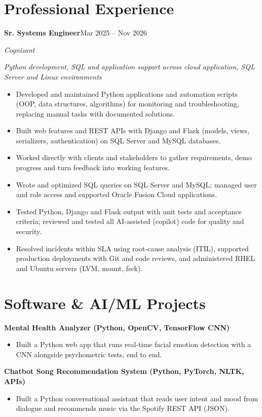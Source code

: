 \documentclass[a4paper,10pt]{article}
\newcommand{\resumeSubheading}[4]{%
  \Needspace{5\baselineskip}%
  \textbf{#1}\hfill #2\par
  \textit{#3}\hfill \textit{#4}\par
}
\newenvironment{resumeItems}{%
  \begin{itemize}[leftmargin=14pt,label=\textbullet,
    labelsep=5pt,topsep=3pt,itemsep=3pt,parsep=0pt,partopsep=0pt]
}{\end{itemize}\vspace{3pt}}
\begin{document}
\section{Professional Experience}
\resumeSubheading
  {Sr. Systems Engineer}{Mar 2025 -- Nov 2026}
  {Cognizant}{}
\textit{Python development, SQL and application support across cloud application, SQL Server and Linux environments}\par
\begin{resumeItems}
  \item Developed and maintained Python applications and automation scripts (OOP, data structures, algorithms) for monitoring and troubleshooting, replacing manual tasks with documented solutions.
  \item Built web features and REST APIs with Django and Flask (models, views, serializers, authentication) on SQL Server and MySQL databases.
  \item Worked directly with clients and stakeholders to gather requirements, demo progress and turn feedback into working features.
  \item Wrote and optimized SQL queries on SQL Server and MySQL; managed user and role access and supported Oracle Fusion Cloud applications.
  \item Tested Python, Django and Flask output with unit tests and acceptance criteria; reviewed and tested all AI-assisted (copilot) code for quality and security.
  \item Resolved incidents within SLA using root-cause analysis (ITIL), supported production deployments with Git and code reviews, and administered RHEL and Ubuntu servers (LVM, mount, fsck).
\end{resumeItems}

\section{Software \& AI/ML Projects}
\textbf{Mental Health Analyzer (Python, OpenCV, TensorFlow CNN)}\par
\begin{resumeItems}
  \item Built a Python web app that runs real-time facial emotion detection with a CNN alongside psychometric tests, end to end.
\end{resumeItems}
\textbf{Chatbot Song Recommendation System (Python, PyTorch, NLTK, APIs)}\par
\begin{resumeItems}
  \item Built a Python conversational assistant that reads user intent and mood from dialogue and recommends music via the Spotify REST API (JSON).
\end{resumeItems}
\end{document}
